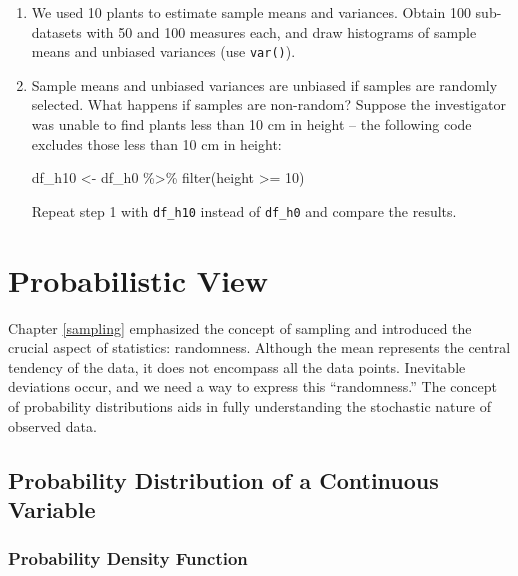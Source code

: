 \documentclass[
]{book}
\newenvironment{Shaded}{\begin{snugshade}}{\end{snugshade}}
\newcommand{\DecValTok}[1]{\textcolor[rgb]{0.00,0.00,0.81}{#1}}
\newcommand{\FunctionTok}[1]{\textcolor[rgb]{0.00,0.00,0.00}{#1}}
\newcommand{\NormalTok}[1]{#1}
\newcommand{\OtherTok}[1]{\textcolor[rgb]{0.56,0.35,0.01}{#1}}
\newcommand{\SpecialCharTok}[1]{\textcolor[rgb]{0.00,0.00,0.00}{#1}}
\begin{document}
\begin{enumerate}
\def\labelenumi{\arabic{enumi}.}
\item
  We used 10 plants to estimate sample means and variances. Obtain 100 sub-datasets with 50 and 100 measures each, and draw histograms of sample means and unbiased variances (use \texttt{var()}).
\item
  Sample means and unbiased variances are unbiased if samples are randomly selected. What happens if samples are non-random? Suppose the investigator was unable to find plants less than 10 cm in height -- the following code excludes those less than 10 cm in height:

\begin{Shaded}
\begin{Highlighting}[]
\NormalTok{df\_h10 }\OtherTok{\textless{}{-}}\NormalTok{ df\_h0 }\SpecialCharTok{\%\textgreater{}\%} 
  \FunctionTok{filter}\NormalTok{(height }\SpecialCharTok{\textgreater{}=} \DecValTok{10}\NormalTok{)}
\end{Highlighting}
\end{Shaded}

  Repeat step 1 with \texttt{df\_h10} instead of \texttt{df\_h0} and compare the results.
\end{enumerate}

\hypertarget{probabilistic-view}{%
\chapter{Probabilistic View}\label{probabilistic-view}}

Chapter \ref{sampling} emphasized the concept of sampling and introduced the crucial aspect of statistics: randomness. Although the mean represents the central tendency of the data, it does not encompass all the data points. Inevitable deviations occur, and we need a way to express this ``randomness.'' The concept of probability distributions aids in fully understanding the stochastic nature of observed data.

\hypertarget{probability-distribution-of-a-continuous-variable}{%
\section{Probability Distribution of a Continuous Variable}\label{probability-distribution-of-a-continuous-variable}}

\hypertarget{probability-density-function}{%
\subsection{Probability Density Function}\label{probability-density-function}}
\end{document}
